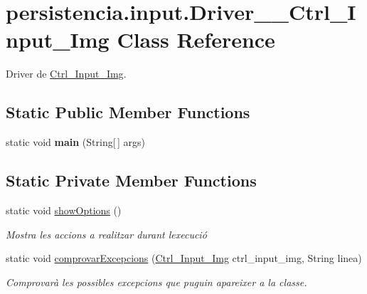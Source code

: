\hypertarget{classpersistencia_1_1input_1_1Driver____Ctrl__Input__Img}{}\section{persistencia.\+input.\+Driver\+\_\+\+\_\+\+Ctrl\+\_\+\+Input\+\_\+\+Img Class Reference}
\label{classpersistencia_1_1input_1_1Driver____Ctrl__Input__Img}


Driver de \hyperlink{classpersistencia_1_1input_1_1Ctrl__Input__Img}{Ctrl\+\_\+\+Input\+\_\+\+Img}.  


\subsection*{Static Public Member Functions}
\begin{DoxyCompactItemize}
\item 
\mbox{\label{classpersistencia_1_1input_1_1Driver____Ctrl__Input__Img_afe531cb182d64111aeead5d061965d8f}} 
static void {\bfseries main} (String\mbox{[}$\,$\mbox{]} args)
\end{DoxyCompactItemize}
\subsection*{Static Private Member Functions}
\begin{DoxyCompactItemize}
\item 
\mbox{\label{classpersistencia_1_1input_1_1Driver____Ctrl__Input__Img_a63892d1060c96a4478541bf0feff579d}} 
static void \hyperlink{classpersistencia_1_1input_1_1Driver____Ctrl__Input__Img_a63892d1060c96a4478541bf0feff579d}{show\+Options} ()
\begin{DoxyCompactList}\small\item\em Mostra les accions a realitzar durant l\textquotesingle{}execució \end{DoxyCompactList}\item 
static void \hyperlink{classpersistencia_1_1input_1_1Driver____Ctrl__Input__Img_a60b4011cee02b5c7fc213230db46d6e0}{comprovar\+Excepcions} (\hyperlink{classpersistencia_1_1input_1_1Ctrl__Input__Img}{Ctrl\+\_\+\+Input\+\_\+\+Img} ctrl\+\_\+input\+\_\+img, String linea)
\begin{DoxyCompactList}\small\item\em Comprovarà les possibles excepcions que puguin apareixer a la classe. \end{DoxyCompactList}\end{DoxyCompactItemize}


